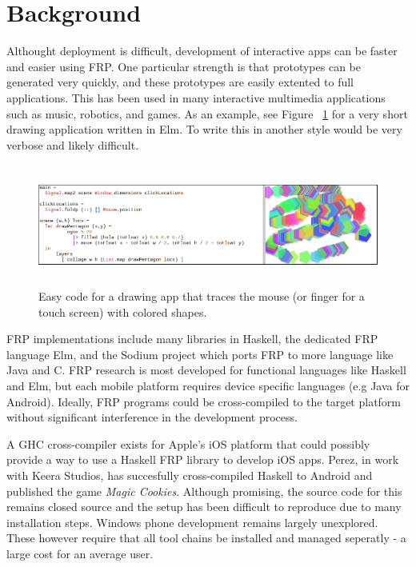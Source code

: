\documentclass[preprint]{sigplanconf}
\begin{document}

\section{Background}
Althought deployment is difficult, development of interactive apps can be faster and easier using FRP.
One particular strength is that prototypes can be generated very quickly, and these prototypes are easily extented to full applications.
This has been used in many interactive multimedia applications such as music, robotics, and games\cite{euterpea}.
As an example, see Figure ~\ref{fig:easy} for a very short drawing application written in Elm.
To write this in another style would be very verbose and likely difficult.

\begin{figure}
  \includegraphics[width=\textwidth,height=4cm]{easy.png}
  \caption{Easy code for a drawing app that traces the mouse (or finger for a touch screen) with colored shapes.}
  \label{fig:easy}
\end{figure}

FRP implementations include many libraries in Haskell, the dedicated FRP language Elm, and the Sodium project which ports FRP to more language like Java and C\cite{}.
FRP research is most developed for functional languages like Haskell and Elm, but each mobile platform requires device specific languages (e.g Java for Android).
Ideally, FRP programs could be cross-compiled to the target platform without significant interference in the development process.


A GHC cross-compiler exists for Apple's iOS platform that could possibly provide a way to use a Haskell FRP library to develop iOS apps.
Perez, in work with Keera Studios, has succesfully cross-compiled Haskell to Android and published the game \textit{Magic Cookies}\cite{}.
Although promising, the source code for this remains closed source and the setup has been difficult to reproduce due to many installation steps.
Windows phone development remains largely unexplored.
These however require that all tool chains be installed and managed seperatly - a large cost for an average user.
\end{document}
